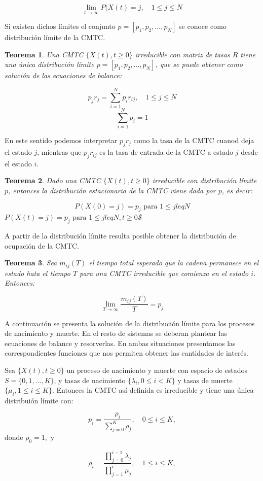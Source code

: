 \documentclass[
]{book}
\newenvironment{bluebox}{
  \definecolor{shadecolor}{rgb}{176, 196, 222}  
  \color{black}
  \begin{shaded}}
 {\end{shaded}}
\newtheorem{theorem}{Teorema}[chapter]
\theoremstyle{definition}
\theoremstyle{definition}
\theoremstyle{definition}
\theoremstyle{definition}
\theoremstyle{remark}
\begin{document}
\[\lim_{t \rightarrow \infty} P(X(t) = j, \quad 1 \leq j \leq N\]

Si existen dichos límites el conjunto \(p = [p_1, p_2,...,p_N]\) se conoce como distribución límite de la CMTC.

\begin{theorem}
Una CMTC \(\{X(t), t \geq 0\}\) irreducible con matriz de tasas \(R\) tiene una única distribución límite \(p = [p_1, p_2,...,p_N]\), que se puede obtener como solución de las ecuaciones de balance:

\[p_j r_j = \sum_{i=1}^N p_ir_{ij}, \quad 1 \leq j \leq N\] \[\sum_{i=1}^N p_i = 1\]
\end{theorem}

En este sentido podemos interpretar \(p_jr_j\) como la tasa de la CMTC cuanod deja el estado \(j\), mientras que \(p_jr_{ij}\) es la tasa de entrada de la CMTC a estado \(j\) desde el estado \(i\).

\begin{theorem}
Dado una CMTC \(\{X(t), t \geq 0\}\) irreducible con distribución límite \(p\), entonces la distribución estacionaria de la CMTC viene dada por \(p\), es decir:

\[P(X(0) = j) = p_j \text{ para } 1 \leq j leq N\] \(P(X(t) = j) = p_j \text{ para } 1 \leq j leq N, t \geq 0\)\$
\end{theorem}

A partir de la distribución límite resulta posible obtener la distribución de ocupación de la CMTC.

\begin{theorem}
Sea \(m_{ij}(T)\) el tiempo total esperado que la cadena permanece en el estado hata el tiempo \(T\) para una CMTC irreducible que comienza en el estado \(i\). Entonces:

\[\lim_{T \rightarrow \infty} \frac{m_{ij}(T)}{T} = p_j\]
\end{theorem}

A continuación se presenta la solución de la distribución límite para los procesos de nacimiento y muerte. En el resto de sistemas se deberan plantear las ecuaciones de balance y resorverlas. En ambas situaciones presentamos las correspondientes funciones que nos permiten obtener las cantidades de interés.

\begin{bluebox}
Sea \(\{X(t), t \geq 0\}\) un proceso de nacimiento y muerte con espacio de estados \(S = \{0, 1,...,K\}\), y tasas de nacimiento \(\{\lambda_i, 0 \leq i < K\}\) y tasas de muerte \(\{\mu_i, 1 \leq i \leq K\}\). Entonces la CMTC así definida es irreducible y tiene una única distribuión límite con:

\[p_i = \frac{\rho_i}{\sum_{j = 0}^K \rho_j}, \quad 0 \leq i \leq K,\] donde \(\rho_0 = 1,\) y

\[\rho_i = \frac{\prod_{j=0}^{i-1}\lambda_j}{\prod_{j=1}^{i}\mu_j}, \quad 1 \leq i \leq K,\]

\end{bluebox}
\end{document}

